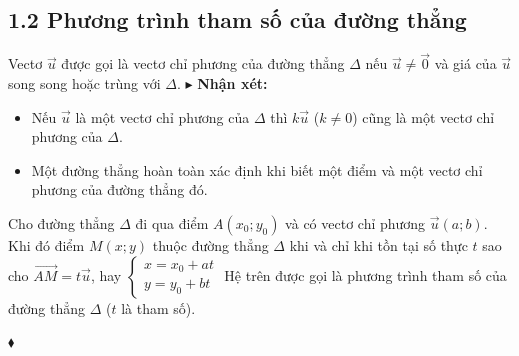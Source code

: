\documentclass[12pt,a4paper]{extarticle}
\begin{document}
\subsection*{\textcolor{book}{1.2 Phương trình tham số của đường thẳng}}
\begin{minipage}{0.65\textwidth}
Vectơ $\vec{u}$ được gọi là vectơ chỉ phương của đường thẳng $\Delta$ nếu $\vec{u} \ne \vec{0}$ và giá của $\vec{u}$ song song hoặc trùng với $\Delta$.
\smallskip
\textcolor{book}{$\blacktriangleright$} \textbf{Nhận xét:}
\begin{itemize}
    \item Nếu $\vec{u}$ là một vectơ chỉ phương của $\Delta$ thì $k\vec{u}$ ($k \ne 0$) cũng là một vectơ chỉ phương của $\Delta$.
    \item Một đường thẳng hoàn toàn xác định khi biết một điểm và một vectơ chỉ phương của đường thẳng đó.
\end{itemize}
\end{minipage}
\hfill
\begin{minipage}{0.3\textwidth}
\centering
{}
\end{minipage}
\begin{minipage}{0.65\textwidth}
Cho đường thẳng $\Delta$ đi qua điểm $A(x_0; y_0)$ và có vectơ chỉ phương $\vec{u}(a; b)$. Khi đó điểm $M(x; y)$ thuộc đường thẳng $\Delta$ khi và chỉ khi tồn tại số thực $t$ sao cho $\overrightarrow{AM} = t\vec{u}$, hay $\begin{cases} x = x_0 + at \\ y = y_0 + bt \end{cases}$
\medskip
Hệ trên được gọi là \textcolor{book}{phương trình tham số} của đường thẳng $\Delta$ ($t$ là tham số).
\end{minipage}
\hfill
\begin{minipage}{0.3\textwidth}
\centering
{}
\end{minipage}
\vspace{0.4cm}
\textcolor{book}{$\blacklozenge$} 
\vspace{0.4cm}
\end{document}
